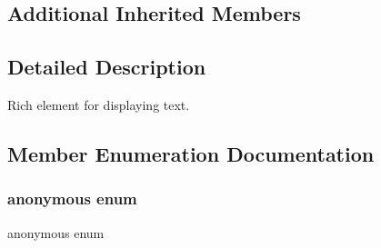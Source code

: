 \subsection*{Additional Inherited Members}


\subsection{Detailed Description}
Rich element for displaying text. 

\subsection{Member Enumeration Documentation}
\mbox{\label{classui_1_1RichElementText_a7ab0318b9177cfd0a69fa9ed8212df3e}} 
\subsubsection{\texorpdfstring{anonymous enum}{anonymous enum}}
{\footnotesize\ttfamily anonymous enum}

